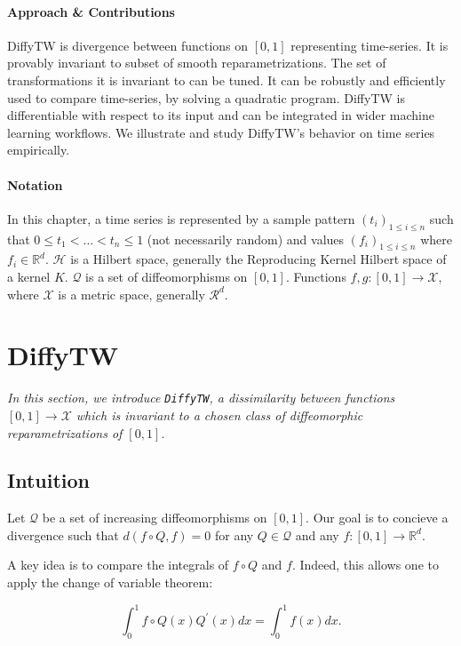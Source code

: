 \paragraph{Approach \& Contributions}
DiffyTW is divergence between functions on $[0,1]$ representing time-series. It is provably invariant to subset of smooth reparametrizations. The set of transformations it is invariant to can be tuned. It can be robustly and efficiently used to compare time-series, by solving a quadratic program. DiffyTW is differentiable with respect to its input and can be integrated in wider machine learning workflows. We illustrate and study DiffyTW's behavior on time series empirically.

\paragraph{Notation} In this chapter, a time series is represented by a sample pattern $(t_i)_{1 \leq i \leq n}$ such that $0 \leq t_1 < \ldots < t_n \leq 1$ (not necessarily random) and values $(f_i)_{1\leq i\leq n}$ where $f_i \in\mathbb R^d$. $\mathcal H$ is a Hilbert space, generally the Reproducing Kernel Hilbert space of a kernel $K$. $\mathcal Q$ is a set of diffeomorphisms on $[0,1]$. Functions $f,g:[0,1] \to \mathcal X$, where $\mathcal X$ is a metric space, generally $\mathcal R^d$.

\section{DiffyTW}
\emph{In this section, we introduce \texttt{DiffyTW}, a dissimilarity between functions $[0,1] \to \mathcal X$ which is invariant to a chosen class of diffeomorphic reparametrizations of $[0,1]$.}

\subsection{Intuition}
Let $\mathcal Q$ be a set of increasing diffeomorphisms on $[0,1]$. Our goal is to concieve a divergence such that $d(f\circ Q, f) = 0$ for any $Q\in\mathcal Q$ and any $f:[0,1] \to \mathbb R^d$.

A key idea is to compare the integrals of $f\circ Q$ and $f$. Indeed, this allows one to apply the change of variable theorem:

\begin{equation}
\int_0^1 f\circ Q(x)Q^\prime(x)dx = \int_0^1 f(x)dx.
\end{equation}

